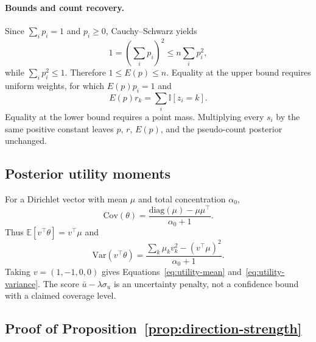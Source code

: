 \documentclass{article}
\newcommand{\E}{\mathbb{E}}
\newcommand{\ind}{\mathbb{I}}
\begin{document}
\paragraph{Bounds and count recovery.}
Since $\sum_i p_i=1$ and $p_i\ge0$, Cauchy--Schwarz yields
\[
1=\left(\sum_i p_i\right)^2\le n\sum_i p_i^2,
\]
while $\sum_i p_i^2\le1$. Therefore $1\le E(p)\le n$. Equality at the upper bound requires uniform weights, for which $E(p)p_i=1$ and
\[
E(p)r_k=\sum_i\ind[z_i=k].
\]
Equality at the lower bound requires a point mass. Multiplying every $s_i$ by the same positive constant leaves $p$, $r$, $E(p)$, and the pseudo-count posterior unchanged.

\subsection{Posterior utility moments}

For a Dirichlet vector with mean $\mu$ and total concentration $\alpha_0$,
\[
\mathrm{Cov}(\theta)
=\frac{\mathrm{diag}(\mu)-\mu\mu^\top}{\alpha_0+1}.
\]
Thus $\E[v^\top\theta]=v^\top\mu$ and
\[
\mathrm{Var}(v^\top\theta)
=\frac{\sum_k\mu_kv_k^2-(v^\top\mu)^2}{\alpha_0+1}.
\]
Taking $v=(1,-1,0,0)$ gives Equations~\ref{eq:utility-mean} and~\ref{eq:utility-variance}. The score $\bar u-\lambda\sigma_u$ is an uncertainty penalty, not a confidence bound with a claimed coverage level.

\subsection{Proof of Proposition~\ref{prop:direction-strength}}
\end{document}

